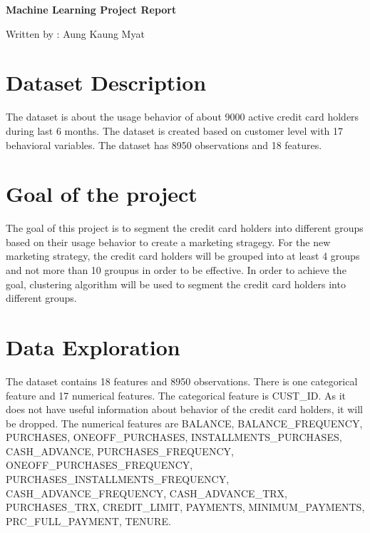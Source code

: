 \documentclass{article}
\begin{document}
    \begingroup
    \begin{center}
        \textbf{Machine Learning Project Report}

        \vspace{1cm}

        Written by : Aung Kaung Myat
    \end{center}
    \endgroup

    \begingroup
    \section {Dataset Description}

    The dataset is about the usage behavior of about 9000 active credit card holders during last 6 months.
    The dataset is created based on customer level with 17 behavioral variables. 
    The dataset has 8950 observations and 18 features. 
    \endgroup

    \hfill

    \begingroup
    \section {Goal of the project}

    The goal of this project is to segment the credit card holders into different groups based on their usage behavior to create a marketing stragegy.
    For the new marketing strategy, the credit card holders will be grouped into at least 4 groups and not more than 10 groupus in order to be effective.
    In order to achieve the goal, clustering algorithm will be used to segment the credit card holders into different groups.
    \endgroup

    \hfill

    \begingroup
    \section {Data Exploration}
    
    The dataset contains 18 features and 8950 observations.
    There is one categorical feature and 17 numerical features.
    The categorical feature is CUST\_ID. As it does not have useful information about behavior of the credit card holders, it will be dropped.
    The numerical features are BALANCE, BALANCE\_FREQUENCY, PURCHASES, ONEOFF\_PURCHASES, INSTALLMENTS\_PURCHASES, CASH\_ADVANCE, PURCHASES\_FREQUENCY, ONEOFF\_PURCHASES\_FREQUENCY, PURCHASES\_INSTALLMENTS\_FREQUENCY, CASH\_ADVANCE\_FREQUENCY, CASH\_ADVANCE\_TRX, PURCHASES\_TRX, CREDIT\_LIMIT, PAYMENTS, MINIMUM\_PAYMENTS, PRC\_FULL\_PAYMENT, TENURE.
    \hfill
\end{document}
